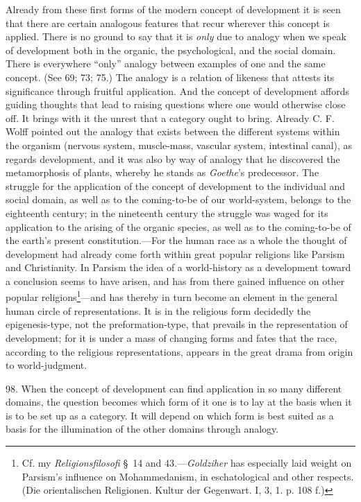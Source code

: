 \documentclass[12pt,a4paper]{book}
\newcommand{\opage}[1]{\marginnote{\footnotesize\textit{[#1]}}}
\begin{document}
Already from these first forms of the modern concept of development it is
seen that there are certain analogous features that recur wherever this
concept is applied. There is no ground to say that it is \emph{only} due to
analogy when we speak of development both in the organic, the psychological,
and the social domain. There is everywhere ``only'' analogy between examples
of one and the same concept. (See 69; 73; 75.) The analogy is a relation of
likeness that attests its significance through fruitful application. And the
concept of development affords guiding thoughts that lead to raising
questions where one would otherwise close off. It brings with it the unrest
that a category ought to bring. Already C. F. Wolff pointed out the
analogy that exists between the different systems within the organism (nervous
system, muscle-mass, vascular system, intestinal canal), as regards
development, and it was also by way of analogy that he discovered the
metamorphosis of plants, whereby he stands as \emph{Goethe}'s predecessor.
The struggle for the application of the concept of development to the
individual and social domain, as well as to the coming-to-be of our
world-system, belongs to the eighteenth century; in the nineteenth century
the struggle was waged for its application to the arising of the organic
species, as well as to the coming-to-be of the earth's present constitution.---For
the human race as a whole the thought of development had already come forth
within great popular religions like Parsism and Christianity. In Parsism the
idea of a world-history as a development toward a conclusion seems to have
arisen, and has from there gained influence on other popular
religions\footnote{Cf. my \emph{Religionsfilosofi} \S\ 14 and 43.---\emph{Goldziher}
has especially laid weight on Parsism's influence on Mohammedanism, in
eschatological and other respects. (Die orientalischen Religionen. Kultur der
Gegenwart. I, 3, 1. p. 108 f.)}---and has thereby in turn become an element in
the general human circle of representations. It is in the religious form
decidedly the epigenesis-type, not the preformation-type, that prevails in
the representation of development; for it is under a mass of changing forms
and fates that the race, according to the \opage{232}religious representations, appears
in the great drama from origin to world-judgment.

98. When the concept of development can find application in so many different
domains, the question becomes which form of it one is to lay at the basis
when it is to be set up as a category. It will depend on which form is best
suited as a basis for the illumination of the other domains through analogy.
\end{document}
